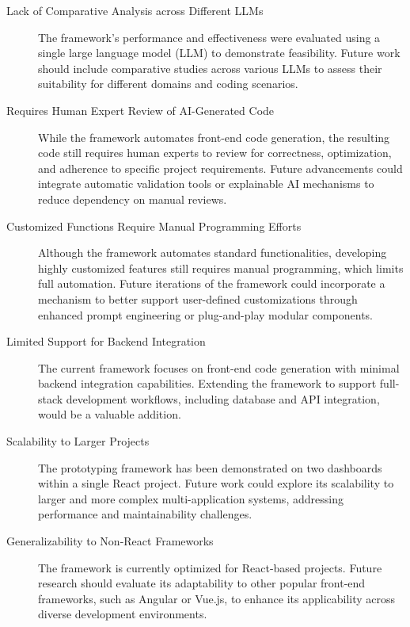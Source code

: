 \begin{description}
    \item[Lack of Comparative Analysis across Different LLMs] The framework's performance and effectiveness were evaluated using a single large language model (LLM) to demonstrate feasibility. Future work should include comparative studies across various LLMs to assess their suitability for different domains and coding scenarios.
    
    \item[Requires Human Expert Review of AI-Generated Code] While the framework automates front-end code generation, the resulting code still requires human experts to review for correctness, optimization, and adherence to specific project requirements. Future advancements could integrate automatic validation tools or explainable AI mechanisms to reduce dependency on manual reviews.

    \item[Customized Functions Require Manual Programming Efforts] Although the framework automates standard functionalities, developing highly customized features still requires manual programming, which limits full automation. Future iterations of the framework could incorporate a mechanism to better support user-defined customizations through enhanced prompt engineering or plug-and-play modular components.

    \item[Limited Support for Backend Integration] The current framework focuses on front-end code generation with minimal backend integration capabilities. Extending the framework to support full-stack development workflows, including database and API integration, would be a valuable addition.

    \item[Scalability to Larger Projects] The prototyping framework has been demonstrated on two dashboards within a single React project. Future work could explore its scalability to larger and more complex multi-application systems, addressing performance and maintainability challenges.

    \item[Generalizability to Non-React Frameworks] The framework is currently optimized for React-based projects. Future research should evaluate its adaptability to other popular front-end frameworks, such as Angular or Vue.js, to enhance its applicability across diverse development environments.
\end{description}

